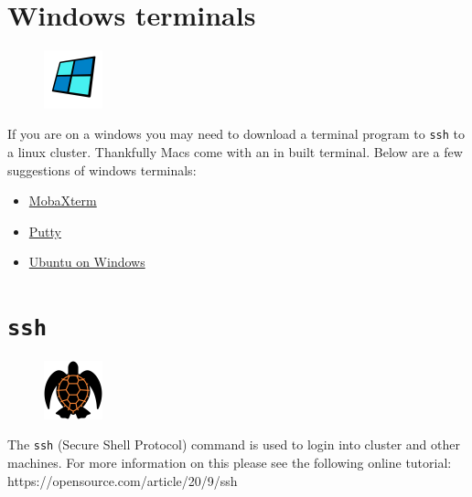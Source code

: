 \documentclass[
  letterpaper,
  DIV=11,
  numbers=noendperiod]{scrreprt}
\providecommand{\tightlist}{%
  \setlength{\itemsep}{0pt}\setlength{\parskip}{0pt}}\usepackage{longtable,booktabs,array}
\begin{document}
\hypertarget{windows-terminals}{%
\chapter{Windows terminals}\label{windows-terminals}}

\begin{figure}

{\centering \includegraphics[width=0.15\textwidth,height=\textheight]{figures/windows.png}

}

\end{figure}

If you are on a windows you may need to download a terminal program to
\texttt{ssh} to a linux cluster. Thankfully Macs come with an in built
terminal. Below are a few suggestions of windows terminals:

\begin{itemize}
\tightlist
\item
  \href{https://mobaxterm.mobatek.net/}{MobaXterm}
\item
  \href{https://www.putty.org/}{Putty}
\item
  \href{https://www.microsoft.com/en-us/p/ubuntu/9nblggh4msv6?activetab=pivot:overviewtab}{Ubuntu
  on Windows}
\end{itemize}

\hypertarget{ssh}{%
\chapter{\texorpdfstring{\texttt{ssh}}{ssh}}\label{ssh}}

\begin{figure}

{\centering \includegraphics[width=0.15\textwidth,height=\textheight]{figures/turtle_shell.png}

}

\end{figure}

The \texttt{ssh} (Secure Shell Protocol) command is used to login into
cluster and other machines. For more information on this please see the
following online tutorial: https://opensource.com/article/20/9/ssh
\end{document}
